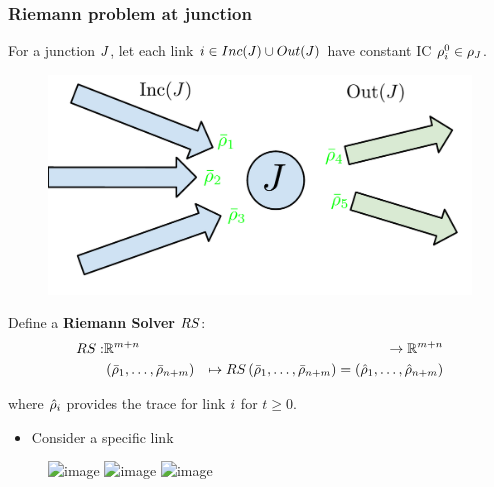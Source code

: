 \begin{frame}
\frametitle{Riemann problem at junction}

For a junction $J$, let each link $i \in Inc(J)\cup Out(J)$ have constant IC $\rho_{i}^0\in \mathbf{\rho}_{J}$.

\begin{figure}
\includegraphics[width=.7\columnwidth]{figs-gen/junctions-riemann}
\end{figure}

\end{frame}

\begin{frame}

Define a \textbf{Riemann Solver} $RS$:
\begin{eqnarray*}
RS: & \mathbb{R}^{m+n} & \rightarrow\mathbb{R}^{m+n}\\
 & \left(\bar{\rho}_{1},\ldots,\bar{\rho}_{n+m}\right) & \mapsto RS\left(\bar{\rho}_{1},\ldots,\bar{\rho}_{n+m}\right)=\left(\hat{\rho}_{1},\ldots,\hat{\rho}_{n+m}\right)
\end{eqnarray*}

where $\hat{\rho}_{i}$ provides the trace for link $i$ for $t \ge 0$.

\begin{itemize}
    \item<2-3> Consider a specific link
\end{itemize}

\begin{figure}
\includegraphics<1>[width=.7\columnwidth]{figs-gen/junctions-riemann-rs}
\includegraphics<2>[width=.7\columnwidth]{figs-gen/junctions-riemann-rs-one}
\includegraphics<3>[width=.7\columnwidth]{figs-gen/riemann-junction}
\end{figure}

\end{frame}

